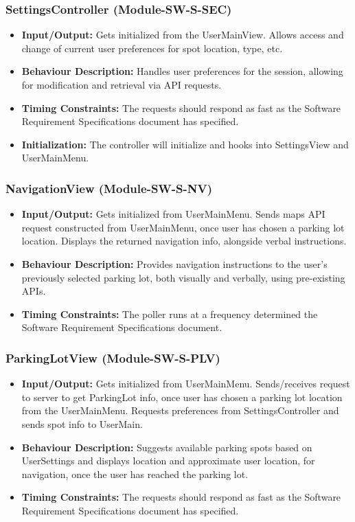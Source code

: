 \documentclass[]{article}
\begin{document}
	\subsubsection{SettingsController (Module-SW-S-SEC)}
	\begin{itemize}
		\item \textbf{Input/Output:} Gets initialized from the UserMainView. Allows access and change of current user preferences for spot location, type, etc.
		\item \textbf{Behaviour Description:} Handles user preferences for the session, allowing for modification and retrieval via API requests.
		\item \textbf{Timing Constraints:} The requests should respond as fast as the Software Requirement Specifications document has specified.
		\item \textbf{Initialization:} The controller will initialize and hooks into SettingsView and UserMainMenu.
	\end{itemize}
	
	\subsubsection{NavigationView (Module-SW-S-NV)}
	\begin{itemize}
		\item \textbf{Input/Output:} Gets initialized from UserMainMenu. Sends maps API request constructed from UserMainMenu, once user has chosen a parking lot location. Displays the returned navigation info, alongside verbal instructions.
		\item \textbf{Behaviour Description:} Provides navigation instructions to the user’s previously selected parking lot, both visually and verbally, using pre-existing APIs.
		\item \textbf{Timing Constraints:} The poller runs at a frequency determined the Software Requirement Specifications document.
	\end{itemize}
	
	\subsubsection{ParkingLotView (Module-SW-S-PLV)}
	\begin{itemize}
		\item \textbf{Input/Output:} Gets initialized from UserMainMenu. Sends/receives request to server to get ParkingLot info, once user has chosen a parking lot location from the UserMainMenu. Requests preferences from SettingsController and sends spot info to UserMain.
		\item \textbf{Behaviour Description:} Suggests available parking spots based on UserSettings and displays location and approximate user location, for navigation, once the user has reached the parking lot.
		\item \textbf{Timing Constraints:} The requests should respond as fast as the Software Requirement Specifications document has specified.
	\end{itemize}
	
\end{document}
